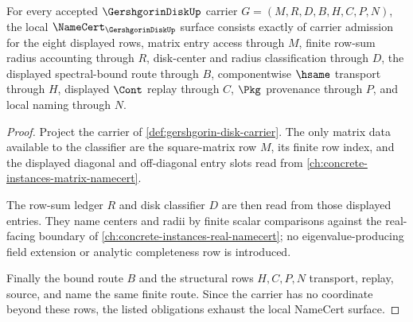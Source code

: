 \begin{theorem}\label{thm:gershgorin-disk-namecert-obligations}
For every accepted $\GershgorinDiskUp$ carrier $G=(M,R,D,B,H,C,P,N)$, the local $\NameCert_{\GershgorinDiskUp}$ surface consists exactly of carrier admission for the eight displayed rows, matrix entry access through $M$, finite row-sum radius accounting through $R$, disk-center and radius classification through $D$, the displayed spectral-bound route through $B$, componentwise $\hsame$ transport through $H$, displayed $\Cont$ replay through $C$, $\Pkg$ provenance through $P$, and local naming through $N$.
\end{theorem}
\begin{proof}
Project the carrier of \autoref{def:gershgorin-disk-carrier}. The only matrix data available to the classifier are the square-matrix row $M$, its finite row index, and the displayed diagonal and off-diagonal entry slots read from \autoref{ch:concrete-instances-matrix-namecert}.

The row-sum ledger $R$ and disk classifier $D$ are then read from those displayed entries. They name centers and radii by finite scalar comparisons against the real-facing boundary of \autoref{ch:concrete-instances-real-namecert}; no eigenvalue-producing field extension or analytic completeness row is introduced.

Finally the bound route $B$ and the structural rows $H,C,P,N$ transport, replay, source, and name the same finite route. Since the carrier has no coordinate beyond these rows, the listed obligations exhaust the local NameCert surface.
\end{proof}

